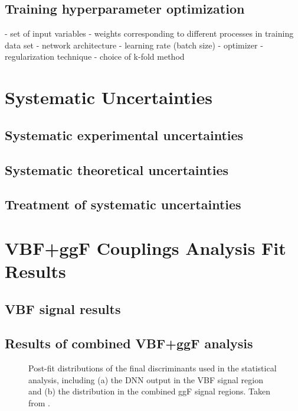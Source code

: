 \subsection{Training hyperparameter optimization}

- set of input variables
- weights corresponding to different processes in training data set
- network architecture
- learning rate (batch size)
- optimizer
- regularization technique
- choice of k-fold method


\section{Systematic Uncertainties}
\subsection{Systematic experimental uncertainties}
\subsection{Systematic theoretical uncertainties}
\subsection{Treatment of systematic uncertainties}

\section{\HWW VBF+ggF Couplings Analysis Fit Results}
\subsection{VBF signal results}

\subsection{Results of combined VBF+ggF analysis}

\begin{figure}
    \caption{Post-fit distributions of the final discriminants used in the statistical analysis, including (a) the DNN output in the VBF signal region and (b) the \mT distribution in the combined ggF signal regions. Taken from .}
    \label{fig:post-fit-final-discriminatns}
\end{figure}


